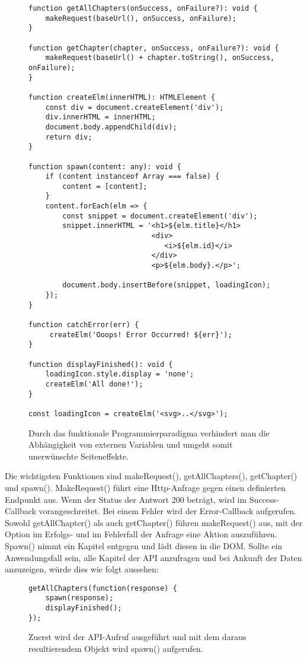 \begin{figure}[H]
\begin{lstlisting}[basicstyle=\small]
function getAllChapters(onSuccess, onFailure?): void {
    makeRequest(baseUrl(), onSuccess, onFailure);
}

function getChapter(chapter, onSuccess, onFailure?): void {
    makeRequest(baseUrl() + chapter.toString(), onSuccess, onFailure);
}

function createElm(innerHTML): HTMLElement {
    const div = document.createElement('div');
    div.innerHTML = innerHTML;
    document.body.appendChild(div);
    return div;
}

function spawn(content: any): void {
    if (content instanceof Array === false) {
        content = [content];
    }
    content.forEach(elm => {
        const snippet = document.createElement('div');
        snippet.innerHTML = '<h1>${elm.title}</h1>
                             <div>
                                <i>${elm.id}</i>
                             </div>
                             <p>${elm.body}.</p>';

        document.body.insertBefore(snippet, loadingIcon);
    });
}

function catchError(err) {
     createElm('Ooops! Error Occurred! ${err}');
}

function displayFinished(): void {
    loadingIcon.style.display = 'none';
    createElm('All done!');
}

const loadingIcon = createElm('<svg>..</svg>');
\end{lstlisting}
\caption{Durch das funktionale Programmierparadigma verhindert man die Abhängigkeit von externen Variablen und umgeht somit unerwünschte Seiteneffekte.}
\end{figure}

\noindent
Die wichtigsten Funktionen sind makeRequest(), getAllChapters(), getChapter() und spawn(). MakeRequest() führt eine Http-Anfrage gegen einen definierten Endpunkt aus. Wenn der Status der Antwort 200 beträgt, wird im Success-Callback vorangeschreitet. Bei einem Fehler wird der Error-Callback aufgerufen. Sowohl getAllChapter() als auch getChapter() führen makeRequest() aus, mit der Option im Erfolgs- und im Fehlerfall der Anfrage eine Aktion auszuführen. Spawn() nimmt ein Kapitel entgegen und lädt diesen in die DOM. Sollte ein Anwendungsfall sein, alle Kapitel der API anzufragen und bei Ankunft der Daten anzuzeigen, würde dies wie folgt aussehen:

\begin{figure}[H]
\begin{lstlisting}[basicstyle=\small]
getAllChapters(function(response) {
    spawn(response);
    displayFinished();
});
\end{lstlisting}
\caption{Zuerst wird der API-Aufruf ausgeführt und mit dem daraus resultierendem Objekt wird spawn() aufgerufen.}
\end{figure}

